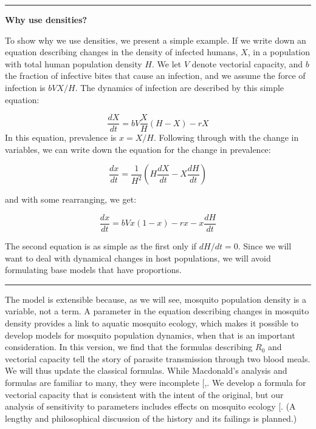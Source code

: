 \documentclass[
]{book}
\begin{document}
\begin{center}\rule{0.5\linewidth}{0.5pt}\end{center}

\textbf{Why use densities?}

To show why we use densities, we present a simple example. If we write down an equation describing changes in the density of infected humans, \(X\), in a population with total human population density \(H\). We let \(V\) denote vectorial capacity, and \(b\) the fraction of infective bites that cause an infection, and we assume the force of infection is \(bVX/H\). The dynamics of infection are described by this simple equation:

\[\frac{dX}{dt} = bV\frac{X}{H}(H-X)-rX\]
In this equation, prevalence is \(x = X/H.\) Following through with the change in variables, we can write down the equation for the change in prevalence:

\[\frac{dx}{dt} = \frac{1}{H^2} \left(H \frac{dX}{dt} - X \frac{dH}{dt} \right)\]

and with some rearranging, we get:

\[\frac{dx}{dt} = bVx(1-x)-rx -x \frac{dH}{dt}\]

The second equation is as simple as the first only if \(dH/dt=0\). Since we will want to deal with dynamical changes in host populations, we will avoid formulating base models that have proportions.

\begin{center}\rule{0.5\linewidth}{0.5pt}\end{center}

The model is extensible because, as we will see, mosquito population density is a variable, not a term. A parameter in the equation describing changes in mosquito density provides a link to aquatic mosquito ecology, which makes it possible to develop models for mosquito population dynamics, when that is an important consideration. In this version, we find that the formulas describing \(R_0\) and vectorial capacity tell the story of parasite transmission through two blood meals. We will thus update the classical formulas. While Macdonald's analysis and formulas are familiar to many, they were incomplete {[},\citeproc{ref-SmithDL2021OldMosquitoes}{56}{]}. We develop a formula for vectorial capacity that is consistent with the intent of the original, but our analysis of sensitivity to parameters includes effects on mosquito ecology {[}\citeproc{ref-BradyOJ2015AdultVector}{57}{]}. (A lengthy and philosophical discussion of the history and its failings is planned.)
\end{document}

